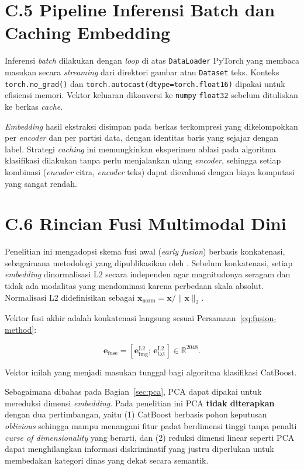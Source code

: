 \section*{C.5 Pipeline Inferensi Batch dan Caching Embedding}

Inferensi \textit{batch} dilakukan dengan \textit{loop} di atas \texttt{DataLoader} PyTorch yang membaca masukan secara \textit{streaming} dari direktori gambar atau \texttt{Dataset} teks. Konteks \texttt{torch.no\_grad()} dan \texttt{torch.autocast(dtype=torch.float16)} dipakai untuk efisiensi memori. Vektor keluaran dikonversi ke \texttt{numpy} \texttt{float32} sebelum dituliskan ke berkas \textit{cache}.

\textit{Embedding} hasil ekstraksi disimpan pada berkas terkompresi yang dikelompokkan per \textit{encoder} dan per partisi data, dengan identitas baris yang sejajar dengan label. Strategi \textit{caching} ini memungkinkan eksperimen ablasi pada algoritma klasifikasi dilakukan tanpa perlu menjalankan ulang \textit{encoder}, sehingga setiap kombinasi (\textit{encoder} citra, \textit{encoder} teks) dapat dievaluasi dengan biaya komputasi yang sangat rendah.

\section*{C.6 Rincian Fusi Multimodal Dini}
\label{app:fusion-detail}

Penelitian ini mengadopsi skema fusi awal (\textit{early fusion}) berbasis konkatenasi, sebagaimana metodologi yang dipublikasikan oleh \citet{hanifPenugasanOtomatis2024}. Sebelum konkatenasi, setiap \textit{embedding} dinormalisasi L2 secara independen agar magnitudonya seragam dan tidak ada modalitas yang mendominasi karena perbedaan skala absolut. Normalisasi L2 didefinisikan sebagai $\mathbf{x}_{\text{norm}} = \mathbf{x} / \|\mathbf{x}\|_2$.

Vektor fusi akhir adalah konkatenasi langsung sesuai Persamaan~\ref{eq:fusion-method}:

\begin{equation}
    \mathbf{e}_{\text{fuse}} = [\mathbf{e}_{\text{img}}^{\text{L2}};\, \mathbf{e}_{\text{txt}}^{\text{L2}}] \in \mathbb{R}^{2048}.
    \label{eq:fusion-method}
\end{equation}

Vektor inilah yang menjadi masukan tunggal bagi algoritma klasifikasi CatBoost.

Sebagaimana dibahas pada Bagian~\ref{sec:pca}, PCA dapat dipakai untuk mereduksi dimensi \textit{embedding}. Pada penelitian ini PCA \textbf{tidak diterapkan} dengan dua pertimbangan, yaitu (1) CatBoost berbasis pohon keputusan \textit{oblivious} sehingga mampu menangani fitur padat berdimensi tinggi tanpa penalti \textit{curse of dimensionality} yang berarti, dan (2) reduksi dimensi linear seperti PCA dapat menghilangkan informasi diskriminatif yang justru diperlukan untuk membedakan kategori dinas yang dekat secara semantik.
